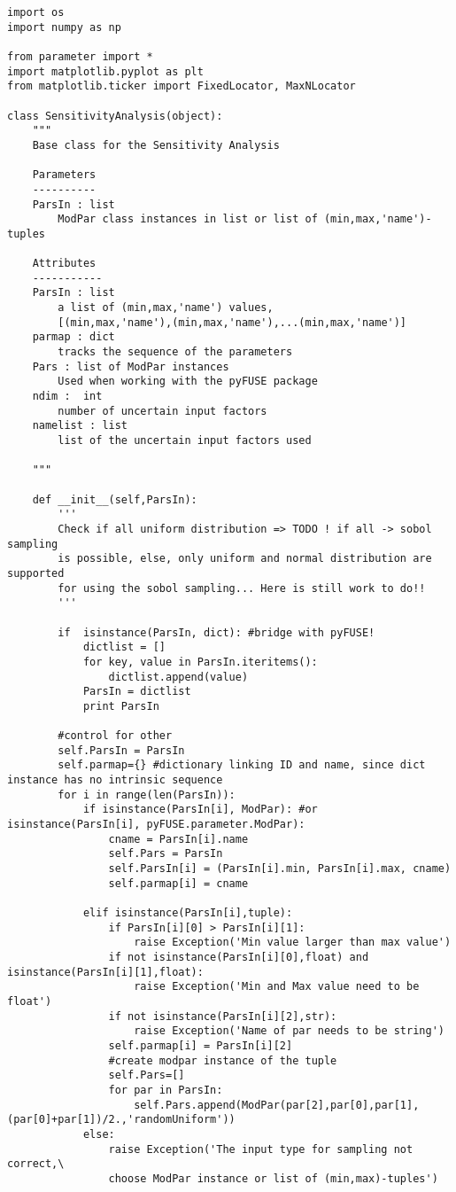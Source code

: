 \begin{lstlisting}
import os
import numpy as np

from parameter import *
import matplotlib.pyplot as plt
from matplotlib.ticker import FixedLocator, MaxNLocator

class SensitivityAnalysis(object):
    """
    Base class for the Sensitivity Analysis
       
    Parameters
    ----------
    ParsIn : list
        ModPar class instances in list or list of (min,max,'name')-tuples
    
    Attributes
    -----------
    ParsIn : list
        a list of (min,max,'name') values, 
        [(min,max,'name'),(min,max,'name'),...(min,max,'name')]
    parmap : dict
        tracks the sequence of the parameters 
    Pars : list of ModPar instances
        Used when working with the pyFUSE package
    ndim :  int
        number of uncertain input factors
    namelist : list
        list of the uncertain input factors used
    
    """
    
    def __init__(self,ParsIn):
        '''
        Check if all uniform distribution => TODO ! if all -> sobol sampling
        is possible, else, only uniform and normal distribution are supported
        for using the sobol sampling... Here is still work to do!!
        '''
        
        if  isinstance(ParsIn, dict): #bridge with pyFUSE!
            dictlist = []
            for key, value in ParsIn.iteritems():
                dictlist.append(value)
            ParsIn = dictlist
            print ParsIn
       
        #control for other 
        self.ParsIn = ParsIn  
        self.parmap={} #dictionary linking ID and name, since dict instance has no intrinsic sequence
        for i in range(len(ParsIn)):
            if isinstance(ParsIn[i], ModPar): #or isinstance(ParsIn[i], pyFUSE.parameter.ModPar):
                cname = ParsIn[i].name
                self.Pars = ParsIn
                self.ParsIn[i] = (ParsIn[i].min, ParsIn[i].max, cname)
                self.parmap[i] = cname
                
            elif isinstance(ParsIn[i],tuple):
                if ParsIn[i][0] > ParsIn[i][1]:
                    raise Exception('Min value larger than max value')
                if not isinstance(ParsIn[i][0],float) and isinstance(ParsIn[i][1],float):
                    raise Exception('Min and Max value need to be float')
                if not isinstance(ParsIn[i][2],str):
                    raise Exception('Name of par needs to be string')                    
                self.parmap[i] = ParsIn[i][2]
                #create modpar instance of the tuple
                self.Pars=[]
                for par in ParsIn:
                    self.Pars.append(ModPar(par[2],par[0],par[1],(par[0]+par[1])/2.,'randomUniform'))
            else:
                raise Exception('The input type for sampling not correct,\
                choose ModPar instance or list of (min,max)-tuples')        
        

\end{lstlisting}
